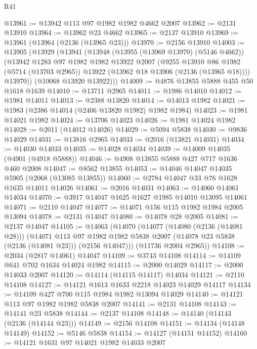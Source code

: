 \begin{lexlean}{R41}
\begin{coremodule}
@13961 := @13942 @113 @97 @1982 @1982 @4662 @2007
@13962 := @2131 @13910
@13964 := @13962 @23 @4662
@13965 := @2137 @13910
@13969 := @13961 (@13964 (@2136 (@13965 @23)))
@13970 := @2156 @13910
@14003 := @13905
    (@13929
      (@13941
        (@13948
          (@13955 (@13969 @13970) (@5146 @4662))
          (@13942
            @1283
            @97
            @1982
            @1982
            @13922
            @2007
            (@9255
              @13910
              @86
              @1982
              (@5714 (@13703 @2965))
              @13922
              (@13962 @18 @13906 (@2136 (@13965 @18))))
            @13970))
        (@10068 @13920 @13922)))
@14009 := @4876 @13855 @5888 @455 @50 @1618 @1639
@14010 := @13711 @2965
@14011 := @1986 @14010
@14012 := @1981 @14011
@14013 := @2388 @13820
@14014 := @14013 @1982
@14021 := @1983 (@2386 @14014 (@2406 @13820 @1982) @1982 @1984)
@14023 := @1981 @14021 @1982
@14024 := @13706 @14023
@14026 := @1981 @14024 @1982
@14028 := @2011 (@14012 @14026)
@14029 := @5094 @5838
@14030 := @9836 @14029
@14031 := @13816 @2965
@14033 := @2016 (@13821 @14031)
@14034 := @14030 @14033
@14035 := @14028 @14034
@14039 := @14009 @14035 (@4901 (@4918 @5888))
@14046 := @4908 @13855 @5888 @427 @717 @1636 @460 @2008
@14047 := @8562 @13855
@14053 := @14046 @14047 @14035 @5905 (@2068 (@13085 @13855))
@14060 := @2784 @14047 @33 @76 @1628 @1635 @14011 @14026
@14061 := @2016 @14031
@14063 := @14060 @14061 @14034
@14070 := @3917 @14047 @1625 @1627 @1985 @14010 @13095 @14061
@14071 := @2110 @14047
@14077 := @14071 @156 @115 @1982 @1984 @2005 @13094
@14078 := @2131 @14047
@14080 := @14078 @28 @2005
@14081 := @2137 @14047
@14105 := @14063
    (@14070
      (@14077
        (@14080 (@2136 (@14081 @28)))
        (@14071
          @113
          @97
          @1982
          @1982
          @5838
          @2007
          (@14078 @23 @5838 (@2136 (@14081 @23)))
          (@2156 @14047)))
      (@11736 @2004 @2965))
@14108 := @2034 (@2817 @14061) @14047
@14109 := @3743 @14108
@14114 := @14109 @641 @702 @1634 @14024 @1982
@14115 := @2000 @14029
@14117 := @2000 @14033 @2007
@14120 := @14114 (@14115 @14117) @14034
@14121 := @2110 @14108
@14127 := @14121 @1613 @1633 @2218 @14023 @14029 @14117
@14134 := @14109 @427 @700 @115 @1984 @1982 @13094 @14029
@14140 := @14121 @113 @97 @1982 @1982 @5838 @2007
@14141 := @2131 @14108
@14143 := @14141 @23 @5838
@14144 := @2137 @14108
@14148 := @14140 (@14143 (@2136 (@14144 @23)))
@14149 := @2156 @14108
@14151 := @14134 (@14148 @14149)
@14152 := @5146 @5838
@14154 := @14127 (@14151 @14152)
@14160 := @14121 @1631 @97 @14021 @1982 @14033 @2007

\end{coremodule}
\end{lexlean}
